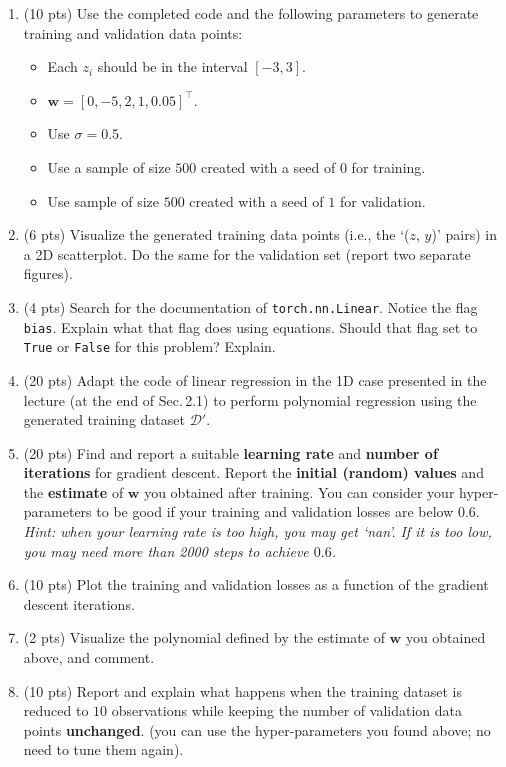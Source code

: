 \documentclass[a4paper,11pt]{article}
\begin{document}
\begin{enumerate}
\item (10 pts) Use the completed code and the following parameters to generate training and validation data points:
\begin{itemize}
\item Each $z_i$ should be in the interval $[-3, 3]$.
\item $\mathbf{w} = [0, -5, 2, 1, 0.05]^\intercal$.
\item Use $\sigma = 0.5$.
\item Use a sample of size $500$ created with a seed of $0$ for training.
\item Use sample of size $500$ created with a seed of $1$ for validation.
\end{itemize}
\item (6 pts) Visualize the generated training data points (i.e., the `($z$, $y$)' pairs) in a 2D scatterplot. Do the same for the validation set (report two separate figures).
\item (4 pts) Search for the documentation of \texttt{torch.nn.Linear}.
Notice the flag \texttt{bias}. Explain what that flag does using equations. 
Should that flag set to \texttt{True} or \texttt{False} for this problem? Explain.
 \item (20 pts) Adapt the code of linear regression in the 1D case presented in the lecture (at the end of Sec.\,2.1) to perform polynomial regression
using the generated training dataset $\mathcal{D}'$.
 \item (20 pts) Find and report a suitable \textbf{learning rate} and \textbf{number of iterations} for gradient descent. Report the \textbf{initial (random) values} and the \textbf{estimate} of $\mathbf{w}$ you obtained after training. You can consider your hyper-parameters to be good if your training and validation losses are below $0.6$. \textit{Hint: when your learning rate is too high, you may get `nan'. If it is too low, you may need more than 2000 steps to achieve $0.6$.}
  \item (10 pts) Plot the training and validation losses as a function of the gradient descent iterations.
 \item (2 pts) Visualize the polynomial defined by the estimate of $\mathbf{w}$ you obtained above, and comment.
\item (10 pts) Report and explain what happens when the training dataset is reduced to $10$ observations while keeping the number of validation data points \textbf{unchanged}. (you can use the hyper-parameters you found above; no need to tune them again).

\end{enumerate}
\end{document}
